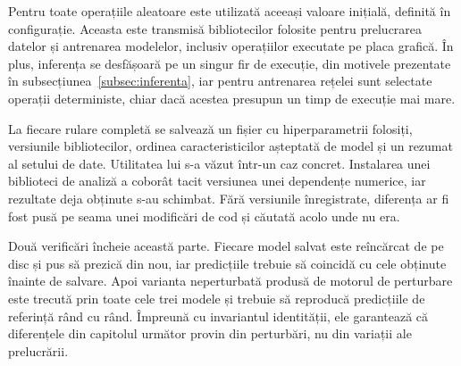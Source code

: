 Pentru toate operațiile aleatoare este utilizată aceeași valoare inițială, definită în configurație. Aceasta este transmisă bibliotecilor folosite pentru prelucrarea datelor și antrenarea modelelor, inclusiv operațiilor executate pe placa grafică. În plus, inferența se desfășoară pe un singur fir de execuție, din motivele prezentate în subsecțiunea~\ref{subsec:inferenta}, iar pentru antrenarea rețelei sunt selectate operații deterministe, chiar dacă acestea presupun un timp de execuție mai mare.

La fiecare rulare completă se salvează un fișier cu hiperparametrii folosiți, versiunile bibliotecilor, ordinea caracteristicilor așteptată de model și un rezumat al setului de date. Utilitatea lui s-a văzut într-un caz concret. Instalarea unei biblioteci de analiză a coborât tacit versiunea unei dependențe numerice, iar rezultate deja obținute s-au schimbat. Fără versiunile înregistrate, diferența ar fi fost pusă pe seama unei modificări de cod și căutată acolo unde nu era.

Două verificări încheie această parte. Fiecare model salvat este reîncărcat de pe disc și pus să prezică din nou, iar predicțiile trebuie să coincidă cu cele obținute înainte de salvare. Apoi varianta neperturbată produsă de motorul de perturbare este trecută prin toate cele trei modele și trebuie să reproducă predicțiile de referință rând cu rând. Împreună cu invariantul identității, ele garantează că diferențele din capitolul următor provin din perturbări, nu din variații ale prelucrării.

